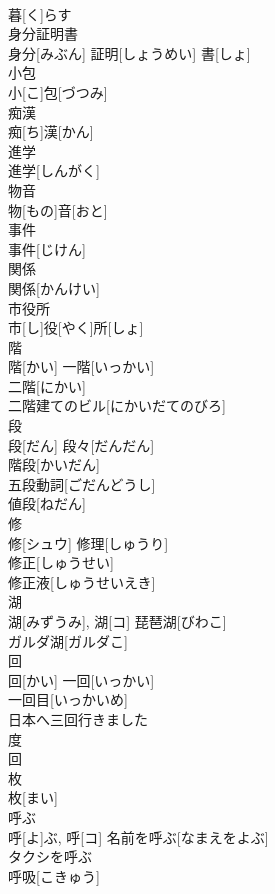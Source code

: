 \documentclass[8pt]{extreport}
\begin{document}
\begin{CJK}{UTF8}{min}
\\	暮[く]らす	
\\	身分証明書	
\\	身分[みぶん] 証明[しょうめい] 書[しょ]	
\\	小包	
\\	小[こ]包[づつみ]	
\\	痴漢	
\\	痴[ち]漢[かん]	
\\	進学	
\\	進学[しんがく]	
\\	物音	
\\	物[もの]音[おと]	
\\	事件	
\\	事件[じけん]	
\\	関係	
\\	関係[かんけい]	
\\	市役所	
\\	市[し]役[やく]所[しょ]	
\\	階	
\\	階[かい]	一階[いっかい] 
\\	二階[にかい] 
\\	二階建てのビル[にかいだてのびろ] 
\\	段	
\\	段[だん]	段々[だんだん] 
\\	階段[かいだん] 
\\	五段動詞[ごだんどうし] 
\\	値段[ねだん] 
\\	修	
\\	修[シュウ]	修理[しゅうり] 
\\	修正[しゅうせい] 
\\	修正液[しゅうせいえき] 
\\	湖	
\\	湖[みずうみ], 湖[コ]	琵琶湖[びわこ] 
\\	ガルダ湖[ガルダこ] 
\\	回	
\\	回[かい]	一回[いっかい] 
\\	一回目[いっかいめ] 
\\	日本へ三回行きました 
\\	度 
\\	回
\\	枚	
\\	枚[まい]	
\\	呼ぶ	
\\	呼[よ]ぶ, 呼[コ]	名前を呼ぶ[なまえをよぶ] 
\\	タクシを呼ぶ　
\\	呼吸[こきゅう] 

\end{CJK}
\end{document}
